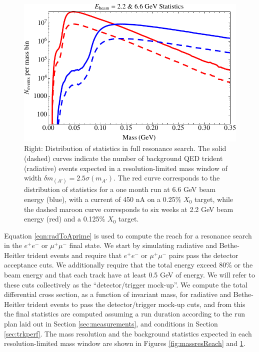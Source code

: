 \begin{figure}
\includegraphics[scale=1.0]{reach/TotalStats.pdf}
\caption{Right: Distribution of statistics in full resonance search.
  The solid (dashed) curves indicate the number of background QED trident (radiative) events expected in a 
  resolution-limited mass window of width $\delta m_(A' )=2.5 \sigma (m_{A'})$.  The red 
curve corresponds to the distribution of statistics for a one month run at 6.6 GeV 
beam energy (blue), with a current of 450 nA on a 0.25\% $X_0$ target, while the dashed maroon 
curve corresponds to six weeks  at 2.2 GeV beam energy (red) and a 0.125\% $X_0$ target.}
\label{fig:totalStats}
\end{figure} 
%

Equation \ref{eqn:radToAprime} is used to compute the reach for a resonance search in the $e^+ e^-$ or 
$\mu^+ \mu^-$ final state. We start by simulating radiative and Bethe-Heitler trident 
events and require that $e^+ e^-$ or $\mu^+ \mu^-$ pairs pass the detector acceptance cuts. 
We additionally require that the total energy exceed 80\% or the beam energy and that each 
track have at least 0.5 GeV of energy. We will refer to these cuts collectively as the 
``detector/trigger mock-up''. We compute the total differential cross section, as 
a function of invariant mass, for radiative and Bethe-Heitler trident events to pass the 
detector/trigger mock-up cuts, and from this the final statistics are computed assuming 
a run duration according to the run plan laid out in Section \ref{sec:measurements}, and conditions in Section \ref{sec:trkperf}.
The  mass resolution  and the background statistics expected in each resolution-limited mass window are shown 
in Figures \ref{fig:massresReach} and \ref{fig:totalStats}.


